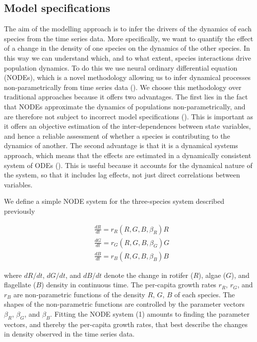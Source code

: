 \documentclass[11pt, oneside]{article}
\begin{document}
\subsection{Model specifications}

The aim of the modelling approach is to infer the drivers of the dynamics of each species from the time series data. 
More specifically, we want to quantify the effect of a change in the density of one species on the dynamics of the other species.
In this way we can understand which, and to what extent, species interactions drive population dynamics.
To do this we use neural ordinary differential equation (NODEs), which is a novel methodology allowing us to infer dynamical processes non-parametrically from time series data (\cite{Bonnaffe2021a}).
We choose this methodology over traditional approaches because it offers two advantages. 
The first lies in the fact that NODEs approximate the dynamics of populations non-parametrically, and are therefore not subject to incorrect model specifications (\cite{Jost2000,Adamson2013}).
This is important as it offers an objective estimation of the inter-dependences between state variables, and hence a reliable assessment of whether a species is contributing to the dynamics of another. 
The second advantage is that it is a dynamical systems approach, which means that the effects are estimated in a dynamically consistent system of ODEs (\cite{Bonnaffe2021a}). 
This is useful because it accounts for the dynamical nature of the system, so that it includes lag effects, not just direct correlations between variables. 

We define a simple NODE system for the three-species system described previously

\begin{equation} \begin{aligned}
	& \frac{dR}{dt} = r_R(R,G,B,\beta_R) R \\
	& \frac{dG}{dt} = r_G(R,G,B,\beta_G) G \\
	& \frac{dB}{dt} = r_B(R,G,B,\beta_B) B
\end{aligned} \end{equation}

where $dR/dt$, $dG/dt$, and $dB/dt$ denote the change in rotifer ($R$), algae ($G$), and flagellate ($B$) density in continuous time.
The per-capita growth rates $r_R$, $r_G$, and $r_B$ are non-parametric functions of the density $R$, $G$, $B$ of each species.
The shapes of the non-parametric functions are controlled by the parameter vectors $\beta_R$, $\beta_G$, and $\beta_B$.
Fitting the NODE system (1) amounts to finding the parameter vectors, and thereby the per-capita growth rates, that best describe the changes in density observed in the time series data. 
\end{document}

